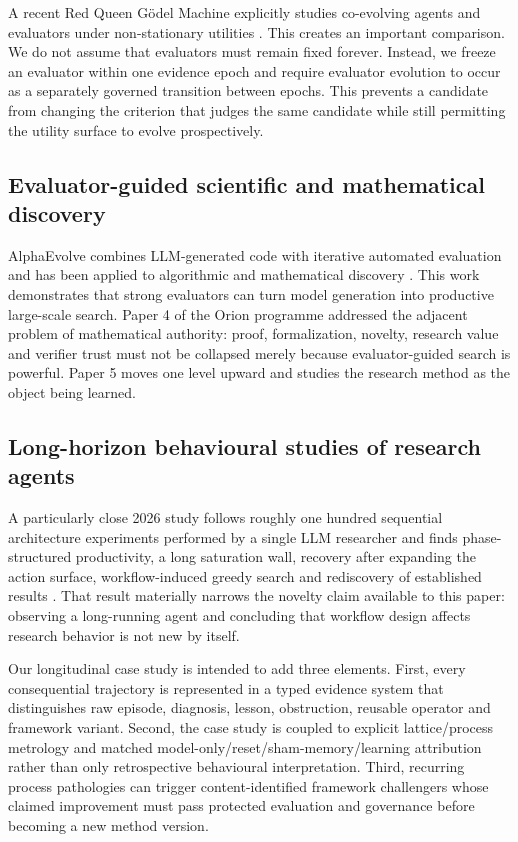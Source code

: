 A recent Red Queen G\"odel Machine explicitly studies co-evolving agents and evaluators under non-stationary utilities \cite{iacob2026redqueen}. This creates an important comparison. We do not assume that evaluators must remain fixed forever. Instead, we freeze an evaluator within one evidence epoch and require evaluator evolution to occur as a separately governed transition between epochs. This prevents a candidate from changing the criterion that judges the same candidate while still permitting the utility surface to evolve prospectively.

\subsection{Evaluator-guided scientific and mathematical discovery}

AlphaEvolve combines LLM-generated code with iterative automated evaluation and has been applied to algorithmic and mathematical discovery \cite{novikov2025alphaevolve,georgiev2025mathscale}. This work demonstrates that strong evaluators can turn model generation into productive large-scale search. Paper 4 of the Orion programme addressed the adjacent problem of mathematical authority: proof, formalization, novelty, research value and verifier trust must not be collapsed merely because evaluator-guided search is powerful. Paper 5 moves one level upward and studies the research method as the object being learned.

\subsection{Long-horizon behavioural studies of research agents}

A particularly close 2026 study follows roughly one hundred sequential architecture experiments performed by a single LLM researcher and finds phase-structured productivity, a long saturation wall, recovery after expanding the action surface, workflow-induced greedy search and rediscovery of established results \cite{safdar2026longhorizon}. That result materially narrows the novelty claim available to this paper: observing a long-running agent and concluding that workflow design affects research behavior is not new by itself.

Our longitudinal case study is intended to add three elements. First, every consequential trajectory is represented in a typed evidence system that distinguishes raw episode, diagnosis, lesson, obstruction, reusable operator and framework variant. Second, the case study is coupled to explicit lattice/process metrology and matched model-only/reset/sham-memory/learning attribution rather than only retrospective behavioural interpretation. Third, recurring process pathologies can trigger content-identified framework challengers whose claimed improvement must pass protected evaluation and governance before becoming a new method version.

